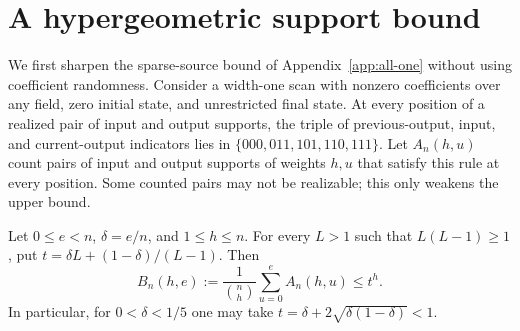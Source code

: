 \section{A hypergeometric support bound}\label{app:hyper-support}

We first sharpen the sparse-source bound of Appendix~\ref{app:all-one}
without using coefficient randomness. Consider a width-one scan with
nonzero coefficients over any field, zero initial state, and unrestricted
final state. At every position of a realized pair of input and output
supports, the triple of previous-output, input, and current-output
indicators lies in $\{000,011,101,110,111\}$. Let $A_n(h,u)$ count pairs
of input and output supports of weights $h,u$ that satisfy this rule at
every position. Some counted pairs may not be realizable; this only
weakens the upper bound.

\begin{lemma}\label{lem:hyper-support}
Let $0\le e<n$, $\delta=e/n$, and $1\le h\le n$. For every $L>1$
such that $L(L-1)\ge1$, put $t=\delta L+(1-\delta)/(L-1)$. Then
\[
 B_n(h,e):=\frac{1}{\binom nh}\sum_{u=0}^e A_n(h,u)\le t^h.
\]
In particular, for $0<\delta<1/5$ one may take
$t=\delta+2\sqrt{\delta(1-\delta)}<1$.
\end{lemma}

